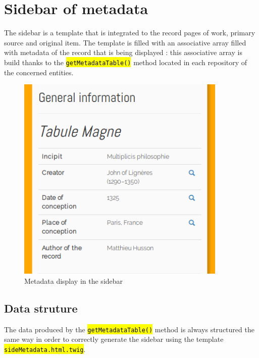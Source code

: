\documentclass[a4paper,12pt,twoside]{book}
\let\OldTexttt\texttt
\renewcommand{\texttt}[1]{\OldTexttt{\hl{#1}}}
\begin{document}
		\section{Sidebar of metadata}\label{sidebar-of-metadata}

The sidebar is a template that is integrated to the record pages of work, primary source and original item. The template is filled with an associative array filled with metadata of the record that is being displayed : this associative array is build thanks to the \texttt{getMetadataTable()} method located in each repository of the concerned entities.

\begin{figure}[H]
	\centering
	\includegraphics[width=10cm]{Images/Sidebar/metadata-work.png}
	\caption{Metadata display in the sidebar}
\end{figure}

				\subsection{Data struture}\label{data-struture}

The data produced by the \texttt{getMetadataTable()} method is always structured the same way in order to correctly generate the sidebar using the template \texttt{sideMetadata.html.twig}.
\end{document}
